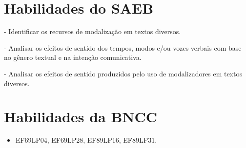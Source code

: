 \begin{itemize}
\begin{itemize}
\section{Habilidades do SAEB}

- Identificar os recursos de modalização em textos diversos.

- Analisar os efeitos de sentido dos tempos, modos e/ou vozes verbais
com base no gênero textual e na intenção comunicativa.

- Analisar os efeitos de sentido produzidos pelo uso de modalizadores em
textos diversos.

\section{Habilidades da BNCC}

\begin{itemize}
\item EF69LP04, EF69LP28, EF89LP16, EF89LP31.
\end{itemize}

\end{itemize}
\end{itemize}
